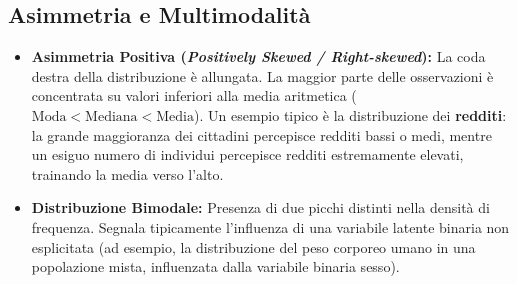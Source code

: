 \subsection{Asimmetria e Multimodalità}
\begin{itemize}
    \item \textbf{Asimmetria Positiva (\textit{Positively Skewed / Right-skewed}):} La coda destra della distribuzione è allungata. La maggior parte delle osservazioni è concentrata su valori inferiori alla media aritmetica ($\text{Moda} < \text{Mediana} < \text{Media}$). Un esempio tipico è la distribuzione dei \textbf{redditi}: la grande maggioranza dei cittadini percepisce redditi bassi o medi, mentre un esiguo numero di individui percepisce redditi estremamente elevati, trainando la media verso l'alto.
    \item \textbf{Distribuzione Bimodale:} Presenza di due picchi distinti nella densità di frequenza. Segnala tipicamente l'influenza di una variabile latente binaria non esplicitata (ad esempio, la distribuzione del peso corporeo umano in una popolazione mista, influenzata dalla variabile binaria sesso).
\end{itemize}

